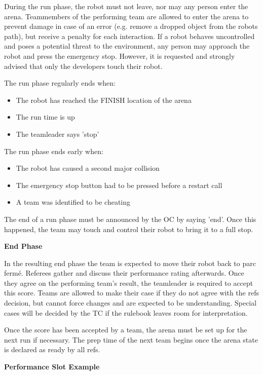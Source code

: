 During the run phase, the robot must not leave, nor may any person enter the arena.
Teammembers of the performing team are allowed to enter the arena to prevent damage in case of an error (e.g. remove a dropped object from the robots path), but receive a penalty for each interaction.
If a robot behaves uncontrolled and poses a potential threat to the environment,
any person may approach the robot and press the emergency stop.
However, it is requested and strongly advised that only the developers touch their robot.

\clearpage

The run phase regularly ends when:
\begin{itemize}
\item The robot has reached the FINISH location of the arena
\item The run time is up
\item The teamleader says 'stop'
\end{itemize}

The run phase ends early when:
\begin{itemize}
\item The robot has caused a second major collision
\item The emergency stop button had to be pressed before a restart call
\item A team was identified to be cheating 
\end{itemize}

The end of a run phase must be announced by the OC by saying 'end'.
Once this happened, the team may touch and control their robot to bring it to a full stop.

\textbf{End Phase}

In the resulting end phase the team is expected to move their robot back to parc ferm\'e.
Referees gather and discuss their performance rating afterwards.
Once they agree on the performing team's result, 
the teamleader is required to accept this score. 
Teams are allowed to make their case if they do not agree with the refs decision,
but cannot force changes and are expected to be understanding.
Special cases will be decided by the TC if the rulebook leaves room for interpretation.

Once the score has been accepted by a team,
the arena must be set up for the next run if necessary.
The prep time of the next team begins once the arena state is declared as ready by all refs.

\textbf{Performance Slot Example}

